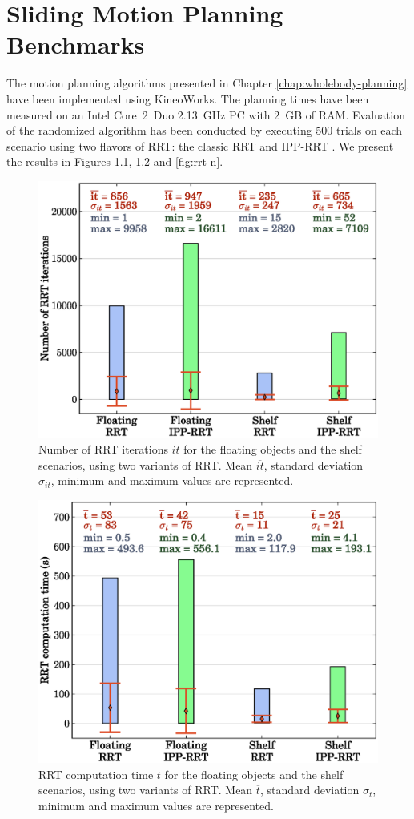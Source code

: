 \chapter{Sliding Motion Planning Benchmarks}
\label{chap:app-sliding}

The motion planning algorithms presented in Chapter
\ref{chap:wholebody-planning} have been implemented using
KineoWorks\texttrademark \cite{laumond2006kcs}. The planning times
have been measured on an Intel Core~2~Duo 2.13~GHz PC with 2~GB of
RAM. Evaluation of the randomized algorithm has been conducted by
executing 500 trials on each scenario using two flavors of RRT: the
classic RRT and IPP-RRT \cite{FERR04A}. We present the results in
Figures \ref{fig:rrt-it}, \ref{fig:rrt-t} and \ref{fig:rrt-n}.

\begin{figure}[h]
\centering
\includegraphics[width=0.7\linewidth]
                {src/appendix/plots/rrt-it.eps}
\caption[Number of RRT iterations for scenarios.]{Number of RRT
  iterations $it$ for the floating objects and the shelf scenarios,
  using two variants of RRT. Mean $\overline{it}$, standard deviation
  $\sigma_{it}$, minimum and maximum values are represented.}
\label{fig:rrt-it}
\end{figure}

\begin{figure}
\centering
\includegraphics[width=0.7\linewidth]
                {src/appendix/plots/rrt-t.eps}
\caption[RRT computation time for scenarios.]{RRT computation time $t$
  for the floating objects and the shelf scenarios, using two variants
  of RRT. Mean $\overline{t}$, standard deviation $\sigma_{t}$,
  minimum and maximum values are represented.}
\label{fig:rrt-t}
\end{figure}

